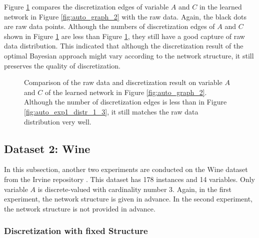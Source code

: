 Figure \ref{fig:auto_exp2_distr_1_3} compares the discretization edges of variable $A$ and $C$ in the learned network in Figure \ref{fig:auto_graph_2} with the raw data. Again, the black dots are raw data points. Although the numbers of discretization edges of $A$ and $C$ shown in Figure \ref{fig:auto_exp2_distr_1_3} are less than Figure \ref{fig:auto_exp2_distr_1_3}, they still have a good capture of raw data distribution. This indicated that although the discretization result of the optimal Bayesian approach might vary according to the network structure, it still preserves the quality of discretization.

\begin{figure}[ht]
      
  \caption{Comparison of the raw data and discretization result on variable $A$ and $C$ of the learned network in Figure \ref{fig:auto_graph_2}. Although the number of discretization edges is less than in Figure \ref{fig:auto_exp1_distr_1_3}, it still matches the raw data distribution very well.}
  \label{fig:auto_exp2_distr_1_3}
\end{figure}


\subsection{Dataset 2: Wine}
\label{subsec:wine}

In this subsection, another two experiments are conducted on the Wine dataset from the Irvine repository \citep{Lichman_2013}. This dataset has 178 instances and 14 variables. Only variable $A$ is discrete-valued with cardinality number \num{3}. Again, in the first experiment, the network structure is given in advance. In the second experiment, the network structure is not provided in advance.

\subsubsection{Discretization with fixed Structure}
\label{subsubsec:wine_exp1}

